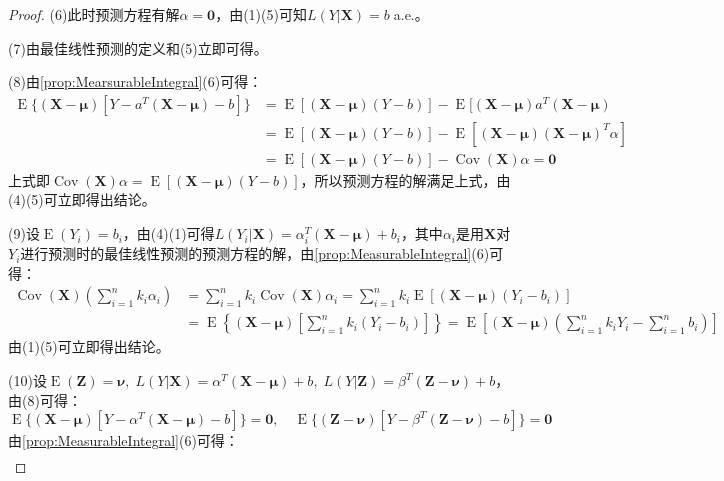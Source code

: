 \begin{proof}
	(6)此时预测方程有解$\alpha=\mathbf{0}$，由(1)(5)可知$L(Y|\mathbf{X})=b\;$a.e.。\par
	(7)由最佳线性预测的定义和(5)立即可得。\par
	(8)由\cref{prop:MearsurableIntegral}(6)可得：
	\begin{align*}
		\operatorname{E}\{(\mathbf{X}-\boldsymbol{\mu})[Y-a^T(\mathbf{X}-\boldsymbol{\mu})-b]\}&=\operatorname{E}[(\mathbf{X}-\boldsymbol{\mu})(Y-b)]-\operatorname{E}[(\mathbf{X}-\boldsymbol{\mu})a^T(\mathbf{X}-\boldsymbol{\mu}) \\
		&=\operatorname{E}[(\mathbf{X}-\boldsymbol{\mu})(Y-b)]-\operatorname{E}[(\mathbf{X}-\boldsymbol{\mu})(\mathbf{X}-\boldsymbol{\mu})^T\alpha] \\
		&=\operatorname{E}[(\mathbf{X}-\boldsymbol{\mu})(Y-b)]-\operatorname{Cov}(\mathbf{X})\alpha=\mathbf{0}
	\end{align*}
	上式即$\operatorname{Cov}(\mathbf{X})\alpha=\operatorname{E}[(\mathbf{X}-\boldsymbol{\mu})(Y-b)]$，所以预测方程的解满足上式，由(4)(5)可立即得出结论。\par
	(9)设$\operatorname{E}(Y_i)=b_i$，由(4)(1)可得$L(Y_i|\mathbf{X})=\alpha_i^T(\mathbf{X}-\boldsymbol{\mu})+b_i$，其中$\alpha_i$是用$\mathbf{X}$对$Y_i$进行预测时的最佳线性预测的预测方程的解，由\cref{prop:MeasurableIntegral}(6)可得：
	\begin{align*}
		\operatorname{Cov}(\mathbf{X})\left(\sum_{i=1}^{n}k_i\alpha_i\right)&=\sum_{i=1}^{n}k_i\operatorname{Cov}(\mathbf{X})\alpha_i=\sum_{i=1}^{n}k_i\operatorname{E}[(\mathbf{X}-\boldsymbol{\mu})(Y_i-b_i)] \\
		&=\operatorname{E}\left\{(\mathbf{X}-\boldsymbol{\mu})\left[\sum_{i=1}^{n}k_i(Y_i-b_i)\right]\right\} =\operatorname{E}\left[(\mathbf{X}-\boldsymbol{\mu})\left(\sum_{i=1}^{n}k_iY_i-\sum_{i=1}^{n}b_i\right)\right]
	\end{align*}
	由(1)(5)可立即得出结论。\par
	(10)设$\operatorname{E}(\mathbf{Z})=\boldsymbol{\nu},\;L(Y|\mathbf{X})=\alpha^T(\mathbf{X}-\boldsymbol{\mu})+b,\;L(Y|\mathbf{Z})=\beta^T(\mathbf{Z}-\boldsymbol{\nu})+b$，由(8)可得：
	\begin{equation*}
		\operatorname{E}\{(\mathbf{X}-\boldsymbol{\mu})[Y-\alpha^T(\mathbf{X}-\boldsymbol{\mu})-b]\}=\mathbf{0},\quad
		\operatorname{E}\{(\mathbf{Z}-\boldsymbol{\nu})[Y-\beta^T(\mathbf{Z}-\boldsymbol{\nu})-b]\}=\mathbf{0}
	\end{equation*}
	由\cref{prop:MeasurableIntegral}(6)可得：
	\begin{align*}

\end{align*}
\end{proof}
